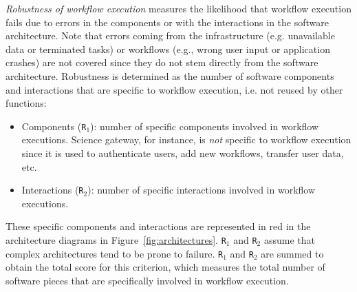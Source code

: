 \documentclass[preprint,3p,twocolumn]{elsarticle}
\begin{document}
\emph{Robustness of workflow execution} measures the likelihood that
workflow execution fails due to errors in the components or with the
interactions in the software architecture. Note that errors coming
from the infrastructure (e.g. unavailable data or terminated tasks) or
workflows (e.g., wrong user input or application crashes) are not
covered since they do not stem directly from the software
architecture. Robustness is determined as the number of software
components and interactions that are specific to workflow execution,
i.e. not reused by other functions:
\begin{itemize}[leftmargin=0cm,itemindent=0.35cm,itemsep=0cm]
\item Components (\texttt{R$_1$}): number of specific components
  involved in workflow executions. Science
gateway, for instance, is \emph{not} specific to workflow execution
since it is used to authenticate users, add new workflows, transfer
user data, etc. 
\item Interactions (\texttt{R$_2$}): number of specific interactions
  involved in workflow executions.
\end{itemize}
These specific components and interactions are represented in red in
the architecture diagrams in
Figure~\ref{fig:architectures}. \texttt{R$_1$} and \texttt{R$_2$}
assume that complex architectures tend to be prone to
failure. \texttt{R$_1$} and \texttt{R$_2$}  are summed to obtain the total score for this
criterion, which measures the total number of software pieces that are
specifically involved in workflow execution.
\end{document}
